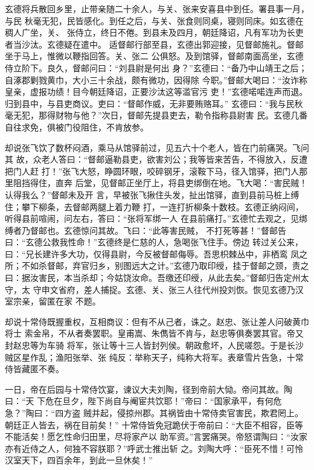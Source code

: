 玄德将兵散回乡里，止带亲随二十余人，与关、张来安喜县中到任。署县事一月，与民
秋毫无犯，民皆感化。到任之后，与关、张食则同桌，寝则同床。如玄德在稠人广坐，关、
张侍立，终日不倦。到县未及四月，朝廷降诏，凡有军功为长吏者当沙汰。玄德疑在遣中。
适督邮行部至县，玄德出郭迎接，见督邮施礼。督邮坐于马上，惟微以鞭指回答。关、张二
公俱怒。及到馆驿，督邮南面高坐，玄德侍立阶下。良久，督邮问曰：“刘县尉是何出
身？”玄德曰：“备乃中山靖王之后；自涿郡剿戮黄巾，大小三十余战，颇有微功，因得除
今职。”督邮大喝曰：“汝诈称皇亲，虚报功绩！目今朝廷降诏，正要沙汰这等滥官污
吏！”玄德喏喏连声而退。归到县中，与县吏商议。吏曰：“督邮作威，无非要贿赂耳。”
玄德曰：“我与民秋毫无犯，那得财物与他？”次日，督邮先提县吏去，勒令指称县尉害
民。玄德几番自往求免，俱被门役阻住，不肯放参。

却说张飞饮了数杯闷酒，乘马从馆驿前过，见五六十个老人，皆在门前痛哭。飞问其
故，众老人答曰：“督邮逼勒县吏，欲害刘公；我等皆来苦告，不得放入，反遭把门人赶
打！”张飞大怒，睁圆环眼，咬碎钢牙，滚鞍下马，径入馆驿，把门人那里阻挡得住，直奔
后堂，见督邮正坐厅上，将县吏绑倒在地。飞大喝：“害民贼！认得我么？”督邮未及开
言，早被张飞揪住头发，扯出馆驿，直到县前马桩上缚住；攀下柳条，去督邮两腿上着力鞭
打，一连打折柳条十数枝。玄德正纳闷间，听得县前喧闹，问左右，答曰：“张将军绑一人
在县前痛打。”玄德忙去观之，见绑缚者乃督邮也。玄德惊问其故。飞曰：“此等害民贼，
不打死等甚！”督邮告曰：“玄德公救我性命！”玄德终是仁慈的人，急喝张飞住手。傍边
转过关公来，曰：“兄长建许多大功，仅得县尉，今反被督邮侮辱。吾思枳棘丛中，非栖鸾
凤之所；不如杀督邮，弃官归乡，别图远大之计。”玄德乃取印绶，挂于督邮之颈，责之
曰：据汝害民，本当杀却；今姑饶汝命。吾缴还印绶，从此去矣。”督邮归告定州太守，太
守申文省府，差人捕捉。玄德、关、张三人往代州投刘恢。恢见玄德乃汉室宗亲，留匿在家
不题。

却说十常侍既握重权，互相商议：但有不从己者，诛之。赵忠、张让差人问破黄巾将士
索金帛，不从者奏罢职。皇甫嵩、朱儁皆不肯与，赵忠等俱奏罢其官。帝又封赵忠等为车骑
将军，张让等十三人皆封列侯。朝政愈坏，人民嗟怨。于是长沙贼区星作乱；渔阳张举、张
纯反：举称天子，纯称大将军。表章雪片告急，十常侍皆藏匿不奏。

一日，帝在后园与十常侍饮宴，谏议大夫刘陶，径到帝前大恸。帝问其故。陶曰：“天
下危在旦夕，陛下尚自与阉宦共饮耶！”帝曰：“国家承平，有何危急？”陶曰：“四方盗
贼并起，侵掠州郡。其祸皆由十常侍卖官害民，欺君罔上。朝廷正人皆去，祸在目前矣！”
十常侍皆免冠跪伏于帝前曰：“大臣不相容，臣等不能活矣！愿乞性命归田里，尽将家产以
助军资。”言罢痛哭。帝怒谓陶曰：“汝家亦有近侍之人，何独不容朕耶？”呼武士推出斩
之。刘陶大呼：“臣死不惜！可怜汉室天下，四百余年，到此一旦休矣！”

